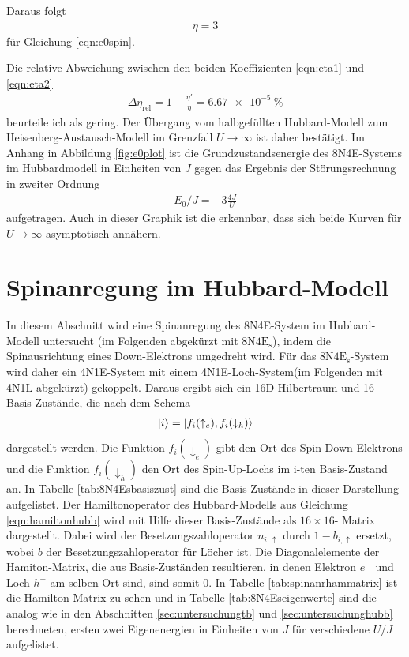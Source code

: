 Daraus folgt
\begin{align}
  \eta = 3
  \label{eqn:eta2}
\end{align}
für Gleichung \eqref{eqn:e0spin}.

Die relative Abweichung zwischen den beiden Koeffizienten \eqref{eqn:eta1} und \eqref{eqn:eta2}
\begin{align}
  \Delta \eta_\text{rel} = 1 - \frac{\eta'}{\eta} = \SI{6.67e-5}{\percent}
\end{align}
beurteile ich als gering. Der Übergang vom halbgefüllten Hubbard-Modell zum Heisenberg-Austausch-Modell im Grenzfall $U \to \infty$ ist daher
bestätigt. Im Anhang in Abbildung \ref{fig:e0plot} ist die Grundzustandsenergie des 8N4E-Systems im Hubbardmodell in Einheiten von $J$ gegen das Ergebnis der Störungsrechnung in zweiter Ordnung
\begin{align}
  E_0/J = - 3 \frac{4J}{U}
\end{align}
aufgetragen. Auch in dieser Graphik ist die erkennbar, dass sich beide Kurven für $U \to \infty$ asymptotisch annähern.

\section{Spinanregung im Hubbard-Modell}

In diesem Abschnitt wird eine Spinanregung des 8N4E-System im Hubbard-Modell untersucht (im Folgenden abgekürzt mit $\text{8N4E}_\text{s}$), indem die Spinausrichtung eines Down-Elektrons umgedreht wird.
Für das $\text{8N4E}_\text{s}$-System wird daher ein 4N1E-System mit einem 4N1E-Loch-System(im Folgenden mit 4N1L abgekürzt) gekoppelt. Daraus ergibt sich ein 16D-Hilbertraum und 16 Basis-Zustände, die nach dem Schema
\begin{align}
  \ket{i} = \ket{f_i(\uparrow_e), f_i(\downarrow_h)}
\end{align}
dargestellt werden. Die Funktion $f_i(\downarrow_e)$ gibt den Ort des Spin-Down-Elektrons und die Funktion $f_i(\downarrow_h)$ den Ort des Spin-Up-Lochs im i-ten Basis-Zustand an.
In Tabelle \ref{tab:8N4Esbasiszust} sind die Basis-Zustände in dieser Darstellung aufgelistet.
Der Hamiltonoperator des Hubbard-Modells aus Gleichung \eqref{eqn:hamiltonhubb} wird mit Hilfe dieser Basis-Zustände als $16 \times 16$- Matrix dargestellt.
Dabei wird der Besetzungszahloperator $n_{i,\uparrow}$ durch $1-b_{i,\uparrow}$ ersetzt, wobei $b$ der Besetzungszahloperator für Löcher ist.
Die Diagonalelemente der Hamiton-Matrix, die aus Basis-Zuständen resultieren, in denen Elektron $e^-$ und Loch $h^+$ am selben Ort sind, sind somit 0.
In Tabelle \ref{tab:spinanrhammatrix} ist die Hamilton-Matrix zu sehen und in Tabelle \ref{tab:8N4Eseigenwerte} sind die analog wie in den Abschnitten \ref{sec:untersuchungtb} und \ref{sec:untersuchunghubb}
berechneten, ersten zwei Eigenenergien in Einheiten von $J$ für verschiedene $U/J$ aufgelistet.

